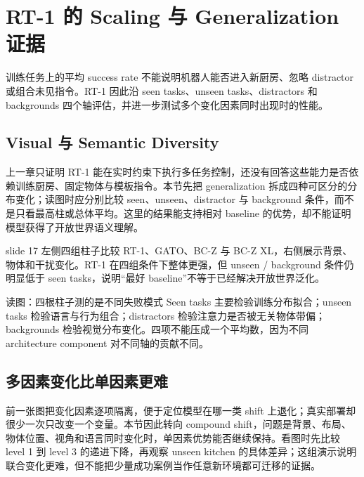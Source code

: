 \section{RT-1 的 Scaling 与 Generalization 证据}

训练任务上的平均 success rate 不能说明机器人能否进入新厨房、忽略 distractor 或组合未见指令。RT-1 因此沿 seen tasks、unseen tasks、distractors 和 backgrounds 四个轴评估，并进一步测试多个变化因素同时出现时的性能。

\subsection{Visual 与 Semantic Diversity}

上一章只证明 RT-1 能在实时约束下执行多任务控制，还没有回答这些能力是否依赖训练厨房、固定物体与模板指令。本节先把 generalization 拆成四种可区分的分布变化；读图时应分别比较 seen、unseen、distractor 与 background 条件，而不是只看最高柱或总体平均。这里的结果能支持相对 baseline 的优势，却不能证明模型获得了开放世界语义理解。

slide 17 左侧四组柱子比较 RT-1、GATO、BC-Z 与 BC-Z XL，右侧展示背景、物体和干扰变化。RT-1 在四组条件下整体更强，但 unseen / background 条件仍明显低于 seen tasks，说明“最好 baseline”不等于已经解决开放世界泛化。


\begin{knowledgebox}{读图：四根柱子测的是不同失败模式}
Seen tasks 主要检验训练分布拟合；unseen tasks 检验语言与行为组合；distractors 检验注意力是否被无关物体带偏；backgrounds 检验视觉分布变化。四项不能压成一个平均数，因为不同 architecture component 对不同轴的贡献不同。
\end{knowledgebox}

\subsection{多因素变化比单因素更难}

前一张图把变化因素逐项隔离，便于定位模型在哪一类 shift 上退化；真实部署却很少一次只改变一个变量。本节因此转向 compound shift，问题是背景、布局、物体位置、视角和语言同时变化时，单因素优势能否继续保持。看图时先比较 level 1 到 level 3 的递进下降，再观察 unseen kitchen 的具体差异；这组演示说明联合变化更难，但不能把少量成功案例当作任意新环境都可迁移的证据。

